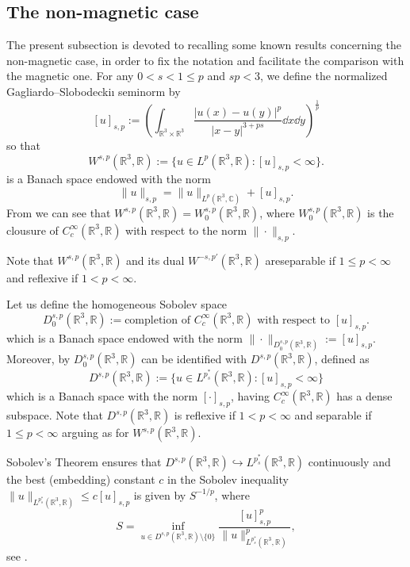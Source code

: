 \documentclass[leqno,11pt]{amsart}
\newcommand{\R}{\mathbb R}
\newcommand{\C}{\mathbb C}
\numberwithin{equation}{section}
\begin{document}
\subsection{The non-magnetic case}\label{nonmagncase}

The present subsection is devoted to recalling some known results concerning the non-magnetic case, in order to fix the notation and facilitate the comparison with the magnetic one.
For any $0<s<1\le p$ and $sp<3$, we define the normalized Gagliardo–Slobodeckiı seminorm
by
$$[u]_{s,p}:=\left(\int_{\R^3\times \R^3}\frac{|u(x) -  u(y)|^p}{|x-y|^{3+ps}} \dd x \dd y \right)^{\frac1p}$$
so that 
$$W^{s,p}(\R^3,\R):=\{u\in L^p(\R^3,\R) : [u]_{s,p}<\infty\}.$$
is a Banach space endowed with the norm
$$\|u\|_{s,p} = \|u\|_{L^p(\R^3,\C)} + [u]_{s,p}.$$
From \cite[Theorem 2.4]{DiPaVa} we can see that $W^{s,p}(\R^3,\R)=W^{s,p}_0(\R^3,\R)$, where $W^{s,p}_0(\R^3,\R)$ is the clousure of $C_c^\infty(\R^3,\R)$ with respect to the norm $\|\cdot\|_{s,p}$.

Note that $W^{s,p}(\R^3,\R)$ and its dual $W^{-s,p'}(\R^3,\R)$ areseparable if $1\le p<\infty$ and reflexive if $1<p<\infty$. 


Let us define the homogeneous Sobolev space
$$D^{s,p}_0(\R^3,\R):=\text{completion of $C_c^\infty(\R^3,\R)$ with respect to $[u]_{s,p}$}.$$
which is a Banach space endowed with the norm $\|\cdot\|_{D^{s,p}_0(\R^3,\R)}:=[u]_{s,p}$. Moreover, by \cite[Theorem 3.1]{BrascoGV} $D^{s,p}_0(\R^3,\R)$ can be identified with $D^{s,p}(\R^3,\R)$, defined as
$$D^{s,p}(\R^3,\R):=\{u\in L^{p^*_s}(\R^3,\R) : [u]_{s,p}<\infty\}$$
which is a Banach space with the norm $[\cdot]_{s,p}$, having $C^\infty_c(\R^3,\R)$ has a dense subspace.
Note that $D^{s,p}(\R^3,\R)$ is reflexive if $1<p<\infty$ and separable if $1\le p<\infty$ arguing as for $W^{s,p}(\R^3,\R)$. 


Sobolev's Theorem ensures that $D^{s,p}(\R^3,\R) \hookrightarrow L^{p^*_s}(\R^3,\R)$ continuously and the best (embedding) constant $c$ in the Sobolev inequality 
$    \|u\|_{L^{p^*_s}(\R^3,\R)}\leq c [u]_{s,p}$
is given by $S^{-1/p}$, where
\begin{equation}\label{S}
S= \inf_{u\in D^{s,p}(\R^3,\R)\setminus\{0\}} \frac{[u]_{s,p}^p}{\|u\|_{L^{p^*_s}(\R^3,\R)}^p},
\end{equation}
see \cite[Remark 3.3]{BrascoGV}.
\end{document}
